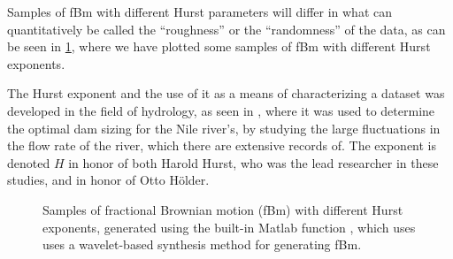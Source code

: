 Samples of fBm with different Hurst parameters will differ in what can quantitatively be called the ``roughness'' or the ``randomness'' of the data, as can be seen in \cref{fig:fBm_examples}, where we have plotted some samples of fBm with different Hurst exponents.


The Hurst exponent and the use of it as a means of characterizing a dataset was developed in the field of hydrology, as seen in \cite{hurst1951longterm,hurst1965longterm}, where it was used to determine the optimal dam sizing for the Nile river's, by studying the large fluctuations in the flow rate of the river, which there are extensive records of. The exponent is denoted $H$ in honor of both Harold Hurst, who was the lead researcher in these studies, and in honor of Otto H\"older.
%
%
\begin{figure}[htpb]%
    \centering%
    {%
        \newcommand{\sa}{H $\approx$ }%
    }%
    \caption{%
        Samples of fractional Brownian motion (fBm) with different Hurst exponents, generated using the built-in Matlab function , which uses uses a wavelet-based synthesis method\cite{abry1996wavelet} for generating fBm.%
    }%
    \label{fig:fBm_examples}%
\end{figure}%
